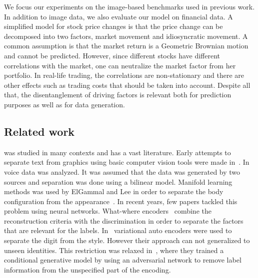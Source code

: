 \documentclass[10pt,twocolumn,letterpaper]{article}
\begin{document}
We focus our experiments on the image-based benchmarks used in previous work. In addition to image data, we also evaluate our model on financial data. A simplified model for stock price changes is that the price change can be decomposed into two factors, market movement and idiosyncratic movement. A common assumption is that the market return is a Geometric Brownian motion and cannot be predicted. However, since different stocks have different correlations with the market, one can neutralize the market factor from her portfolio. In real-life trading, the correlations are non-stationary and there are other effects such as trading costs that should be taken into account. Despite all that, the disentanglement of driving factors is relevant both for prediction purposes as well as for data generation. 

\subsection{Related work}

 was studied in many contexts and has a vast literature. Early attempts to separate text from graphics using basic computer vision tools were made in~\cite{fletch}. In~\cite{tenenbaum} voice data was analyzed. It was assumed that the data was generated by two sources and separation was done using a bilinear model. Manifold learning methods was used by ElGammal and Lee in order to separate the body configuration from the appearance~\cite{elgammal}. In recent years, few papers tackled this problem using neural networks. What-where encoders~\cite{huang} combine the reconstruction criteria with the discrimination in order to separate the factors that are relevant for the labels. In~\cite{kingma} variational auto encoders were used to separate the digit from the style. However their approach can not generalized to unseen identities. This restriction was relaxed in~\cite{disentanglement}, where they trained a conditional generative model by using an adversarial network to remove label information from the unspecified part of the encoding.  
\end{document}
